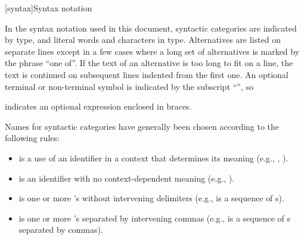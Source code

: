 [syntax]{Syntax notation}

\pnum
{}%
In the syntax notation used in this document, syntactic
categories are indicated by  type, and literal words
and characters in   type. Alternatives are
listed on separate lines except in a few cases where a long set of
alternatives is marked by the phrase ``one of''. If the text of an alternative is too long to fit on a line, the text is continued on subsequent lines indented from the first one.
An optional terminal or non-terminal symbol is indicated by the subscript
``\opt{\relax}'', so
\begin{ncbnf}
\terminal{\{}  \terminal{\}}
\end{ncbnf}
indicates an optional expression enclosed in braces.%

\pnum
Names for syntactic categories have generally been chosen according to
the following rules:
\begin{itemize}
\item {} is a use of an identifier in a context that
determines its meaning (e.g., ,
).
\item {} is an identifier with no context-dependent meaning
(e.g., ).
\item {} is one or more 's without intervening
delimiters (e.g.,  is a sequence of
s).
\item {} is one or more 's separated by
intervening commas (e.g.,  is a sequence of
s separated by commas).
\end{itemize}%

